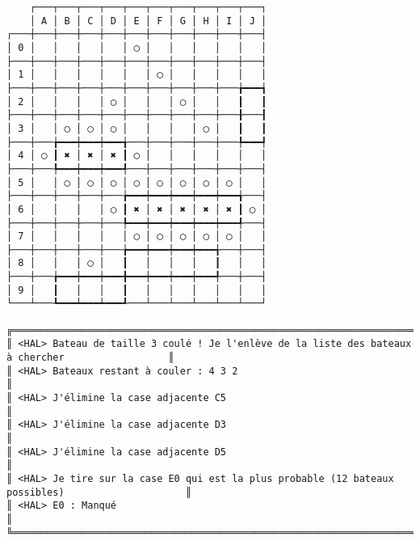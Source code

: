 {\scriptsize
\begin{verbatim}
    ┌───┬───┬───┬───┬───┬───┬───┬───┬───┬───┐
    │ A │ B │ C │ D │ E │ F │ G │ H │ I │ J │
┌───┼───┼───┼───┼───┼───┼───┼───┼───┼───┼───┤
│ 0 │   │   │   │   │ ◯ │   │   │   │   │   │
├───┼───┼───┼───┼───┼───┼───┼───┼───┼───┼───┤
│ 1 │   │   │   │   │   │ ◯ │   │   │   │   │
├───┼───┼───┼───┼───┼───┼───┼───┼───┼───╆━━━┪
│ 2 │   │   │   │ ◯ │   │   │ ◯ │   │   ┃   ┃
├───┼───┼───┼───┼───┼───┼───┼───┼───┼───╂───┨
│ 3 │   │ ◯ │ ◯ │ ◯ │   │   │   │ ◯ │   ┃   ┃
├───┼───╆━━━┿━━━┿━━━╅───┼───┼───┼───┼───╄━━━┩
│ 4 │ ◯ ┃ ✖ │ ✖ │ ✖ ┃ ◯ │   │   │   │   │   │
├───┼───╄━━━┿━━━┿━━━╃───┼───┼───┼───┼───┼───┤
│ 5 │   │ ◯ │ ◯ │ ◯ │ ◯ │ ◯ │ ◯ │ ◯ │ ◯ │   │
├───┼───┼───┼───┼───╆━━━┿━━━┿━━━┿━━━┿━━━╅───┤
│ 6 │   │   │   │ ◯ ┃ ✖ │ ✖ │ ✖ │ ✖ │ ✖ ┃ ◯ │
├───┼───┼───┼───┼───╄━━━┿━━━┿━━━┿━━━┿━━━╃───┤
│ 7 │   │   │   │   │ ◯ │ ◯ │ ◯ │ ◯ │ ◯ │   │
├───┼───┼───┼───┼───╆━━━┿━━━┿━━━┿━━━╅───┼───┤
│ 8 │   │   │ ◯ │   ┃   │   │   │   ┃   │   │
├───┼───╆━━━┿━━━┿━━━╋━━━┿━━━┿━━━┿━━━╃───┼───┤
│ 9 │   ┃   │   │   ┃   │   │   │   │   │   │
└───┴───┺━━━┷━━━┷━━━┹───┴───┴───┴───┴───┴───┘

╔══════════════════════════════════════════════════════════════════════════════════════════════════╗
║ <HAL> Bateau de taille 3 coulé ! Je l'enlève de la liste des bateaux à chercher                  ║
║ <HAL> Bateaux restant à couler : 4 3 2                                                           ║
║ <HAL> J'élimine la case adjacente C5                                                             ║
║ <HAL> J'élimine la case adjacente D3                                                             ║
║ <HAL> J'élimine la case adjacente D5                                                             ║
║ <HAL> Je tire sur la case E0 qui est la plus probable (12 bateaux possibles)                     ║
║ <HAL> E0 : Manqué                                                                                ║
╚══════════════════════════════════════════════════════════════════════════════════════════════════╝
\end{verbatim}}
\newpage

